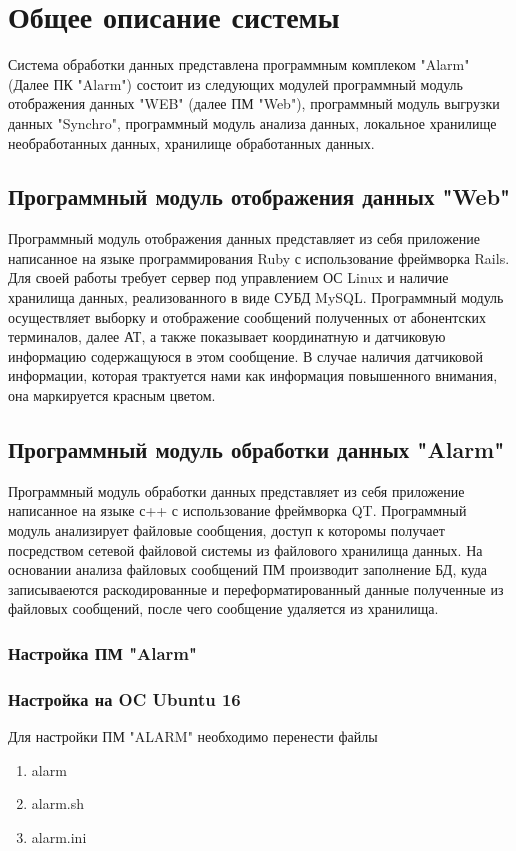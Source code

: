 \documentclass[12pt]{article}[a4paper,14pt,russian]
\begin{document}
	\section{Общее описание системы}
	Система обработки данных представлена программным комплеком "Alarm" (Далее ПК "Alarm") состоит из следующих модулей
	программный модуль отображения данных "WEB" (далее ПМ "Web"), программный модуль выгрузки данных "Synchro",
	программный модуль анализа данных, локальное хранилище необработанных данных, хранилище обработанных данных.
	
	\subsection{Программный модуль отображения данных "Web"}
	Программный модуль отображения данных представляет из себя приложение написанное
	на языке программирования Ruby с использование фреймворка Rails. Для своей работы требует сервер под управлением ОС Linux и наличие хранилища данных, реализованного в виде СУБД MySQL. Программный модуль осуществляет выборку и отображение сообщений полученных от абонентских терминалов, далее АТ, а также показывает координатную и датчиковую информацию содержащуюся в этом сообщение. В случае наличия датчиковой информации, которая трактуется нами как информация повышенного внимания, она маркируется красным цветом.
	
	\subsection{Программный модуль обработки данных "Alarm"}
	Программный модуль обработки данных представляет из себя приложение написанное на
	языке с++ с использование фреймворка QT. Программный модуль анализирует файловые сообщения, доступ к которомы получает посредством сетевой файловой системы из файлового хранилища данных. На основании анализа файловых сообщений ПМ производит заполнение БД, куда записываеются раскодированные и переформатированный данные полученные из файловых сообщений, после чего сообщение удаляется из хранилища. 
	\subsubsection{Настройка ПМ "Alarm"}
	\subsubsection{Настройка на OC Ubuntu 16}
	Для настройки ПМ "ALARM" необходимо перенести файлы
	\begin{enumerate}
	\item alarm
	\item alarm.sh
	\item alarm.ini
	\end{enumerate}
	
\end{document}
